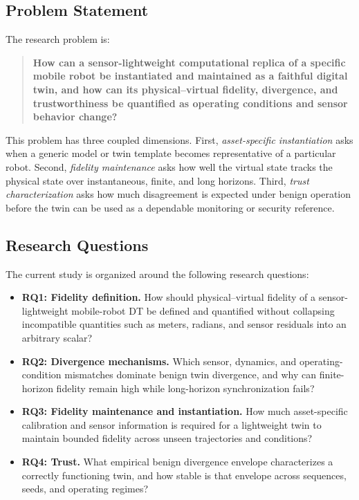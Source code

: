 \documentclass[conference]{IEEEtran}
\begin{document}
\subsection{Problem Statement}
The research problem is:

\begin{quote}
\textbf{How can a sensor-lightweight computational replica of a specific mobile robot be instantiated and maintained as a faithful digital twin, and how can its physical--virtual fidelity, divergence, and trustworthiness be quantified as operating conditions and sensor behavior change?}
\end{quote}

This problem has three coupled dimensions. First, \emph{asset-specific instantiation} asks when a generic model or twin template becomes representative of a particular robot. Second, \emph{fidelity maintenance} asks how well the virtual state tracks the physical state over instantaneous, finite, and long horizons. Third, \emph{trust characterization} asks how much disagreement is expected under benign operation before the twin can be used as a dependable monitoring or security reference.

\subsection{Research Questions}
The current study is organized around the following research questions:
\begin{itemize}
    \item \textbf{RQ1: Fidelity definition.} How should physical--virtual fidelity of a sensor-lightweight mobile-robot DT be defined and quantified without collapsing incompatible quantities such as meters, radians, and sensor residuals into an arbitrary scalar?
    \item \textbf{RQ2: Divergence mechanisms.} Which sensor, dynamics, and operating-condition mismatches dominate benign twin divergence, and why can finite-horizon fidelity remain high while long-horizon synchronization fails?
    \item \textbf{RQ3: Fidelity maintenance and instantiation.} How much asset-specific calibration and sensor information is required for a lightweight twin to maintain bounded fidelity across unseen trajectories and conditions?
    \item \textbf{RQ4: Trust.} What empirical benign divergence envelope characterizes a correctly functioning twin, and how stable is that envelope across sequences, seeds, and operating regimes?
\end{itemize}
\end{document}
